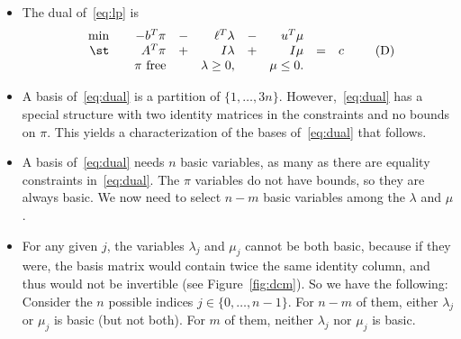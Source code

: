 \begin{itemize}
\item The dual of~\eqref{eq:lp} is
\begin{equation}
\begin{array}{rcrcrcrcl}
\min & & -b^T \pi & - & \ell^T \lambda & - & u^T \mu & & \\
\st  & & A^T \pi & + & I \lambda & + & I \mu & = & c \\
     & & \pi \text{ free} & & \lambda \geq 0, & &  \mu \leq 0. & & 
\end{array}
\tag{D}
\label{eq:dual}
\end{equation}

\item A basis of~\eqref{eq:dual} is a partition
	of $\{ 1, \ldots, 3n \}$.
	However,~\eqref{eq:dual} has a special structure with two
	identity matrices in the constraints and no bounds on $\pi$.
	This yields a characterization of the bases of~\eqref{eq:dual}
	that follows.

\item A basis of~\eqref{eq:dual} needs $n$ basic variables,
	as many as there are equality constraints in~\eqref{eq:dual}.
	The $\pi$ variables do not have bounds, so they are always basic.
	We now need to select $n - m$ basic variables among the $\lambda$
	and $\mu$.

\item For any given $j$, the variables $\lambda_j$ and $\mu_j$ cannot be
	both basic, because if they were,
	the basis matrix would contain twice the same identity
	column, and thus would not be invertible
	(see Figure~\ref{fig:dcm}). So we have the following:
	Consider the $n$ possible indices $j \in \{ 0, \ldots, n-1 \}$.
	For $n - m$ of them, either $\lambda_j$ or $\mu_j$ is
	basic (but not both). For $m$ of them, neither $\lambda_j$
	nor $\mu_j$ is basic.
	

\end{itemize}
